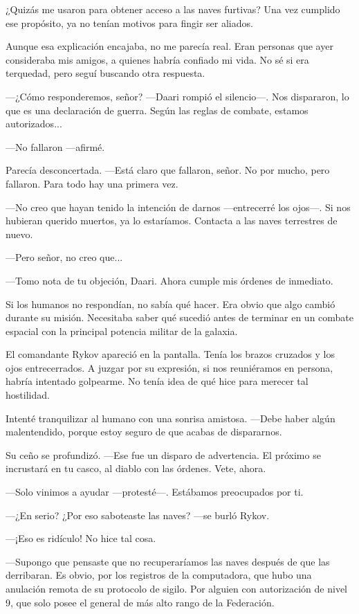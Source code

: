 ¿Quizás me usaron para obtener acceso a las naves furtivas? Una vez cumplido ese propósito, ya no tenían motivos para fingir ser aliados.

Aunque esa explicación encajaba, no me parecía real. Eran personas que ayer consideraba mis amigos, a quienes habría confiado mi vida. No sé si era terquedad, pero seguí buscando otra respuesta.

 —¿Cómo responderemos, señor? —Daari rompió el silencio—. Nos dispararon, lo que es una declaración de guerra. Según las reglas de combate, estamos autorizados...

—No fallaron —afirmé.

Parecía desconcertada. —Está claro que fallaron, señor. No por mucho, pero fallaron. Para todo hay una primera vez.

—No creo que hayan tenido la intención de darnos —entrecerré los ojos—. Si nos hubieran querido muertos, ya lo estaríamos. Contacta a las naves terrestres de nuevo.

—Pero señor, no creo que...

—Tomo nota de tu objeción, Daari. Ahora cumple mis órdenes de inmediato.

Si los humanos no respondían, no sabía qué hacer. Era obvio que algo cambió durante su misión. Necesitaba saber qué sucedió antes de terminar en un combate espacial con la principal potencia militar de la galaxia.

El comandante Rykov apareció en la pantalla. Tenía los brazos cruzados y los ojos entrecerrados. A juzgar por su expresión, si nos reuniéramos en persona, habría intentado golpearme. No tenía idea de qué hice para merecer tal hostilidad.

Intenté tranquilizar al humano con una sonrisa amistosa. —Debe haber algún malentendido, porque estoy seguro de que acabas de dispararnos.

Su ceño se profundizó. —Ese fue un disparo de advertencia. El próximo se incrustará en tu casco, al diablo con las órdenes. Vete, ahora.

—Solo vinimos a ayudar —protesté—. Estábamos preocupados por ti.

 —¿En serio? ¿Por eso saboteaste las naves? —se burló Rykov.

—¡Eso es ridículo! No hice tal cosa.

—Supongo que pensaste que no recuperaríamos las naves después de que las derribaran. Es obvio, por los registros de la computadora, que hubo una anulación remota de su protocolo de sigilo. Por alguien con autorización de nivel 9, que solo posee el general de más alto rango de la Federación.

